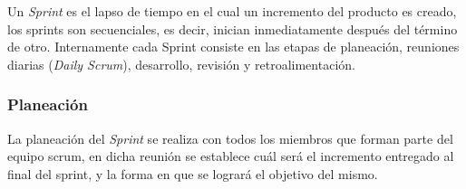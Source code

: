  Un {\it Sprint} es el lapso de tiempo en el cual un incremento del producto es creado, los sprints
 son secuenciales, es decir, inician inmediatamente después del término de otro. Internamente 
 cada Sprint consiste en las etapas de planeación, reuniones diarias ({\it Daily Scrum}),
 desarrollo, revisión y retroalimentación.
    
    

    

    
\subsubsection{Planeación}

 La planeación del {\it Sprint} se realiza con todos los miembros que forman parte del equipo scrum,
 en dicha reunión se establece cuál será el incremento entregado al final del sprint, y la forma
 en que se logrará el objetivo del mismo.\\

